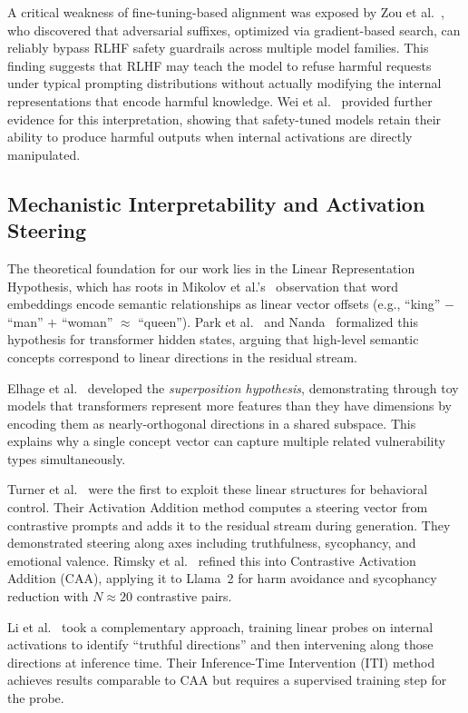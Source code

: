 \documentclass[journal, onecolumn]{IEEEtran}
\begin{document}
A critical weakness of fine-tuning-based alignment was exposed by Zou et al.~\cite{zou2023}, who discovered that adversarial suffixes, optimized via gradient-based search, can reliably bypass RLHF safety guardrails across multiple model families. This finding suggests that RLHF may teach the model to refuse harmful requests under typical prompting distributions without actually modifying the internal representations that encode harmful knowledge. Wei et al.~\cite{wei2024} provided further evidence for this interpretation, showing that safety-tuned models retain their ability to produce harmful outputs when internal activations are directly manipulated.

\subsection{Mechanistic Interpretability and Activation Steering}

The theoretical foundation for our work lies in the Linear Representation Hypothesis, which has roots in Mikolov et al.'s~\cite{mikolov2013} observation that word embeddings encode semantic relationships as linear vector offsets (e.g., ``king'' $-$ ``man'' $+$ ``woman'' $\approx$ ``queen''). Park et al.~\cite{park2024} and Nanda~\cite{nanda2023} formalized this hypothesis for transformer hidden states, arguing that high-level semantic concepts correspond to linear directions in the residual stream.

Elhage et al.~\cite{elhage2022} developed the \textit{superposition hypothesis}, demonstrating through toy models that transformers represent more features than they have dimensions by encoding them as nearly-orthogonal directions in a shared subspace. This explains why a single concept vector can capture multiple related vulnerability types simultaneously.

Turner et al.~\cite{turner2023} were the first to exploit these linear structures for behavioral control. Their Activation Addition method computes a steering vector from contrastive prompts and adds it to the residual stream during generation. They demonstrated steering along axes including truthfulness, sycophancy, and emotional valence. Rimsky et al.~\cite{rimsky2024} refined this into Contrastive Activation Addition (CAA), applying it to Llama~2 for harm avoidance and sycophancy reduction with $N \approx 20$ contrastive pairs.

Li et al.~\cite{li2024} took a complementary approach, training linear probes on internal activations to identify ``truthful directions'' and then intervening along those directions at inference time. Their Inference-Time Intervention (ITI) method achieves results comparable to CAA but requires a supervised training step for the probe.
\end{document}

